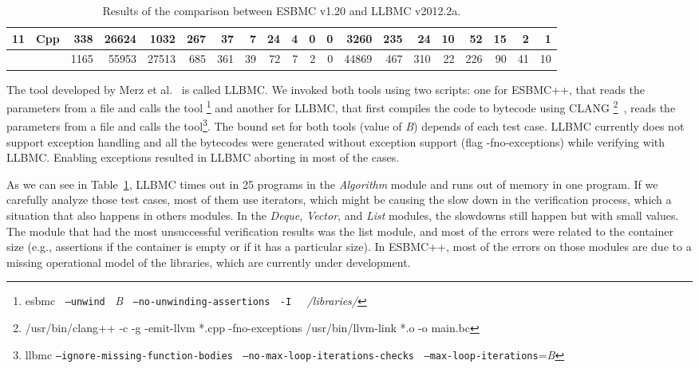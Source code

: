 \documentclass[a4paper]{llncs}
\begin{document}
\begin{table}[t!]
\begin{adjustwidth}{-2cm}{}
\begin{center}
{\begin{tabular}{|c|l|r|r||r|r|r|r|r|r|r|r|r|r|r|r|r|r|r|r|}
\hline
11 & Cpp        & 338  & 26624 & 1032  & 267  & 37  & 7   & 24   & 4    & 0    & 0     & 3260   & 235 & 24  & 10  & 52  & 15   & 2   & 1\\ %
\hline\hline
  &             & 1165 & 55953 & 27513 & 685  & 361   & 39   & 72  & 7  & 2    & 0     & 44869  & 467 & 310 & 22  & 226 & 90   & 41  & 10\\ %
\hline
\end{tabular} }
\end{center}
\caption{Results of the comparison between ESBMC v1.20 and LLBMC v2012.2a.} \vspace*{-4ex}
\label{table:results-of-the-comparison-between-ESBMC-and-LLBMC}
\end{adjustwidth}
\end{table}

The tool developed by Merz et al.~\cite{Florian12} is called LLBMC.
We invoked both tools using two scripts: one for ESBMC++, that reads
the parameters from a file and calls the tool
\footnote[1]{esbmc $\:$ {\tt --unwind} $\:$ \textit{B} $\:$ {\tt --no-unwinding-assertions} $\:$ {\tt -I} $\:$ \textit{~/libraries/}}
and another for LLBMC, that first compiles the code to bytecode using CLANG
\footnote[2]{/usr/bin/clang++ -c -g -emit-llvm *.cpp -fno-exceptions \newline /usr/bin/llvm-link *.o -o main.bc}~\cite{CLANG},
reads the parameters from a file and calls the tool\footnote[3]
{llbmc {\tt --ignore-missing-function-bodies} $\:$ {\tt --no-max-loop-iterations-checks} $\:$ {\tt --max-loop-iterations}=\textit{B}}.
The bound set for both tools (value of \textit{B}) depends of each test case.
LLBMC currently does not support exception handling and all the bytecodes were generated without
exception support (flag -fno-exceptions) while verifying with LLBMC.
Enabling exceptions resulted in LLBMC aborting in most of the cases.

As we can see in Table~\ref{table:results-of-the-comparison-between-ESBMC-and-LLBMC},
LLBMC times out in 25 programs in the \textit{Algorithm} module and
runs out of memory in one program. If we carefully analyze those test cases,
most of them use iterators, which might be causing the slow down
in the verification process, which a situation that also happens in others modules.
In the \textit{Deque}, \textit{Vector}, and \textit{List} modules,
the slowdowns still happen but with small values. The module that had the
most unsuccessful verification results was the list module, and most of the
errors were related to the container size (e.g., assertions if the container
is empty or if it has a particular size). In ESBMC++, most of the errors on
those modules are due to a missing operational model
of the libraries, which are currently under development.
\end{document}

